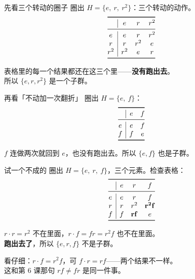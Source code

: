 \documentclass[10pt]{beamer}
\begin{document}
\begin{frame}{先看三个转动的圈子}
  圈出 \(H=\{e,\ r,\ r^2\}\)：三个转动的动作。
  \pause
  \[
  \begin{array}{@{}c|ccc@{}}
    \toprule
    & e & r & r^2 \\
    \midrule
    e & e & r & r^2 \\
    r & r & r^2 & e \\
    r^2 & r^2 & e & r \\
    \bottomrule
  \end{array}
  \]
  \pause
  \begin{center}
    表格里的每一个结果都还在这三个里——\textbf{没有跑出去}。\\[0.4em]
    所以 \(\{e,r,r^2\}\) 是一个子群。
  \end{center}
\end{frame}

\begin{frame}{再看「不动加一次翻折」}
  圈出 \(H=\{e,\ f\}\)：
  \[
  \begin{array}{@{}c|cc@{}}
    \toprule
    & e & f \\
    \midrule
    e & e & f \\
    f & f & e \\
    \bottomrule
  \end{array}
  \]
  \pause
  \begin{center}
    \(f\) 连做两次就回到 \(e\)，也没有跑出去。所以 \(\{e,f\}\) 也是子群。
  \end{center}
\end{frame}

\begin{frame}{试一个不成的}
  圈出 \(H=\{e,\ r,\ f\}\)，三个元素。\pause 检查表格：
  \[
  \begin{array}{@{}c|ccc@{}}
    \toprule
    & e & r & f \\
    \midrule
    e & e & r & f \\
    r & r & r^2 & \mathbf{r^2f} \\
    f & f & \mathbf{rf} & e \\
    \bottomrule
  \end{array}
  \]
  \pause
  \begin{center}
    \(r\cdot r=r^2\) 不在里面，\(r\cdot f=fr=r^2f\) 也不在里面。\\[0.4em]
    \textbf{跑出去了}，所以 \(\{e,r,f\}\) 不是子群。
  \end{center}
  \pause
  \begin{center}
    {\small 看仔细：\(r\cdot f=r^2f\)，可 \(f\cdot r=rf\)——两个结果不一样。\\
    这和第 6 课那句 \(rf\neq fr\) 是同一件事。}
  \end{center}
\end{frame}
\end{document}
